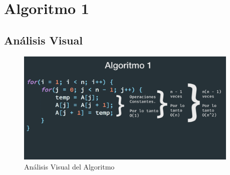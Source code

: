 \documentclass[12pt, fleqn]{article}                            %
\theoremstyle{break}                                            %
\begin{document}
\restoregeometry                                                    %
\nopagecolor                                                        %


\tableofcontents{}
\label{sec:Index}

\clearpage



\clearpage
\section{Algoritmo 1}


    \subsection{Análisis Visual}

        \begin{figure}[h]
            \centering
            \includegraphics[width=0.95\textwidth]{Algoritmo1}
            \caption{Análisis Visual del Algoritmo}
        \end{figure}

    \vspace{1em}
\end{document}
